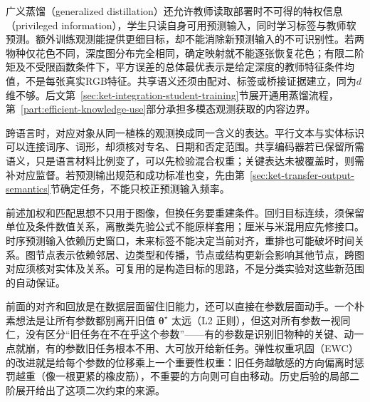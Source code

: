 广义蒸馏（generalized distillation）还允许教师读取部署时不可得的特权信息（privileged information），学生只读自身可用预测输入，同时学习标签与教师软预测。额外训练观测能提供更细目标，却不能消除新预测输入的不可识别性。若两物种仅花色不同，深度图分布完全相同，确定映射就不能逐张恢复花色；有限二阶矩及不受限函数条件下，平方误差的总体最优表示是给定深度的教师特征条件均值，不是每张真实RGB特征。共享语义还须由配对、标签或桥接证据建立，同为$d$维不够。后文第~\ref{sec:ket-integration-student-training}节展开通用蒸馏流程，第~\ref{part:efficient-knowledge-use}部分承担多模态观测获取的内容边界。

跨语言时，对应对象从同一植株的观测换成同一含义的表达。平行文本与实体标识可以连接词序、词形，却须核对专名、日期和否定范围。共享编码器若已保留所需语义，只是语言材料比例变了，可以先检验混合权重；关键表达未被覆盖时，则需补对应监督。若预测输出规范和成功标准也变，先由第~\ref{sec:ket-transfer-output-semantics}节确定任务，不能只校正预测输入频率。

前述加权和匹配思想不只用于图像，但换任务要重建条件。回归目标连续，须保留单位及条件数值关系，离散类先验公式不能原样套用；厘米与米混用应先修接口。时序预测输入依赖历史窗口，未来标签不能决定当前对齐，重排也可能破坏时间关系。图节点表示依赖邻居、边类型和传播，节点或结构更新会影响其他节点，跨图对应须核对实体及关系。可复用的是构造目标的思路，不是分类实验对这些新范围的自动保证。

前面的对齐和回放是在数据层面留住旧能力，还可以直接在参数层面动手。一个朴素想法是让所有参数都别离开旧值 $\bm{\theta}^\star$ 太远（L2 正则），但这对所有参数一视同仁，没有区分“旧任务在不在乎这个参数”——有的参数是识别旧物种的关键、动一点就崩，有的参数旧任务根本不用、大可放开给新任务。弹性权重巩固（EWC）的改进就是给每个参数的位移乘上一个重要性权重：旧任务越敏感的方向偏离时惩罚越重（像一根更紧的橡皮筋），不重要的方向则可自由移动。历史后验的局部二阶展开给出了这项二次约束的来源。

